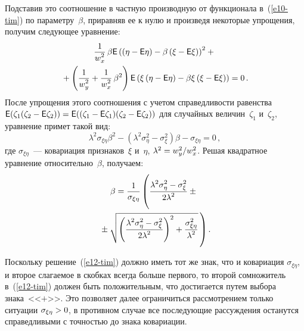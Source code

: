 \begin{multicols}{2}
  Подставив это соотношение в частную производную от функционала
в~(\ref{e10-tim}) по параметру~$\beta$, приравняв ее к нулю и произведя
некоторые упрощения, получим следующее уравнение:
  \begin{multline*}
  \displaystyle\frac{\displaystyle 1\mathstrut}{\displaystyle w_x^2\mathstrut}\,\beta {\sf E} \left( \left( \eta- {\sf E}\eta\right) -\beta\left( \xi - {\sf E}\xi\right)
\right)^2 +{}\\
{}+\left( \displaystyle\frac{\displaystyle 1\mathstrut}{\displaystyle w_y^2\mathstrut} +\displaystyle\frac{\displaystyle 1\mathstrut}{\displaystyle w_x^2\mathstrut}\,\beta^2 \right) {\sf E} \left( \xi \left(
\eta-{\sf E}\eta\right) -\beta \xi\left( \xi-{\sf E}\xi\right) \right) =0\,.
  \end{multline*}
После упрощения этого соотношения с учетом справедливости равенства
${\sf E}(\zeta_1(\zeta_2\hm-{\sf E}\zeta_2))\hm ={\sf E}((\zeta_1\hm-{\sf E}\zeta_1) (\zeta_2\hm-
{\sf E}\zeta_2))$ для случайных величин~$\zeta_1$ и~$\zeta_2$, уравнение примет
такой вид:
\begin{equation}
\lambda^2 \sigma_{\xi\eta}\beta^2 - \left( \lambda^2 \sigma^2_\eta-
\sigma^2_\xi\right) \beta -\sigma_{\xi\eta}=0\,,
\label{e11-tim}
\end{equation}
где $\sigma_{\xi\eta}$~--- ковариация признаков~$\xi$ и~$\eta$,
$\lambda^2\hm=w_y^2/w_x^2$. Решая квадратное уравнение
относительно~$\beta$, получаем:
\begin{multline}
\beta= \fr{1}{\sigma_{\xi\eta}}\left(
\vphantom{\sqrt{\left( \fr{\lambda^2\sigma^2_\eta -
\sigma^2_\xi}{2\lambda^2}\right)^2
+\fr{\sigma^2_{\xi\eta}}{\lambda^2}}}
 \fr{\lambda^2\sigma^2_\eta -
\sigma_\xi^2}{2\lambda^2}\pm {}\right.\\
\left.{}\pm\sqrt{\left( \fr{\lambda^2\sigma^2_\eta -
\sigma^2_\xi}{2\lambda^2}\right)^2
+\fr{\sigma^2_{\xi\eta}}{\lambda^2}}\,\right).
\label{e12-tim}
\end{multline}

  Поскольку решение~(\ref{e12-tim}) должно иметь тот же знак, что и
ковариация $\sigma_{\xi\eta}$, и второе слагаемое в скобках всегда больше
первого, то второй сомножитель в~(\ref{e12-tim}) должен быть
положительным, что достигается путем выбора знака~<<$+$>>. Это
позволяет далее ограничиться рассмотрением только ситуации
$\sigma_{\xi\eta}\hm>0$, в противном случае все последующие рассуждения
останутся справедливыми с точностью до знака ковариации.


\end{multicols}
